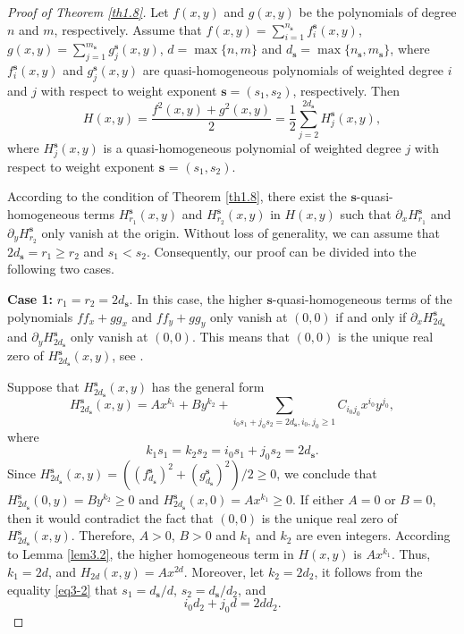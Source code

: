 \documentclass[10pt,a4paper]{amsart}
\numberwithin{equation}{section}
\begin{document}
\begin{proof}[Proof of Theorem \ref{th1.8}]
Let $f(x,y)$ and $g(x,y)$  be the polynomials of degree $n$ and $m$, respectively. 
Assume that $f(x,y)=\sum_{i=1}^{n_{\mathbf{s}}}f^{\mathbf{s}}_{i}(x,y)$, 
$g(x,y)=\sum_{j=1}^{m_{\mathbf{s}}}g^{\mathbf{s}}_{j}(x,y)$, $d=\max\{n,m\}$ and 
$d_{\mathbf{s}}=\max\{n_{\mathbf{s}},m_{\mathbf{s}}\}$, where 
$f^{\mathbf{s}}_{i}(x,y)$ and $g^{\mathbf{s}}_{j}(x,y)$ are quasi-homogeneous 
polynomials of weighted degree $i$ and $j$ with respect to weight exponent 
$\mathbf{s}=(s_1,s_2)$, respectively. Then
\[
H(x,y)=\frac{f^2(x,y)+g^2(x,y)}{2}
=\frac{1}{2}\sum_{j=2}^{2d_{\mathbf{s}}}H^{\mathbf{s}}_{j}(x,y),
\]
where $H^{\mathbf{s}}_j(x,y)$ is a quasi-homogeneous polynomial of weighted degree 
$j$ with respect to weight exponent $\mathbf{s}$ = $(s_1,s_2)$.

According to the condition of Theorem \ref{th1.8}, there exist the 
$\mathbf{s}$-quasi-homogeneous terms  $H^{\mathbf{s}}_{r_1}(x,y)$ and 
$H^{\mathbf{s}}_{r_2}(x,y)$ in  $H(x,y)$ such that
$\partial_{x}H^{\mathbf{s}}_{r_1}$ and $\partial_{y}H^{\mathbf{s}}_{r_2}$ only 
vanish at the origin. Without loss of generality, we can assume that 
$2d_{\mathbf{s}}=r_1\geq r_2$ and $s_1<s_2$. Consequently, our proof can be divided into 
the following two cases.
\smallskip

\noindent\textbf{Case 1:} $r_1=r_2=2d_{\mathbf{s}}$.
In this case, the higher $\mathbf{s}$-quasi-homogeneous terms of the polynomials 
$ ff_{x}+gg_{x} $ and $ ff_{y}+gg_{y} $ only vanish at $ (0,0) $ if and only if 
$\partial_{x}H^{\mathbf{s}}_{2d_{\mathbf{s}}}$ and 
$\partial_{y}H^{\mathbf{s}}_{2d_{\mathbf{s}}}$ only vanish at $ (0,0)$. 
This means that $(0,0)$ is the unique real zero of 
$H^{\mathbf{s}}_{2d_{\mathbf{s}}}(x,y)$, see \cite[Corollary 1]{bib 19}.

Suppose that $H^{\mathbf{s}}_{2d_{\mathbf{s}}}(x,y)$ has the general form
\begin{equation}\label{eq3-1}
H^{\mathbf{s}}_{2d_{\mathbf{s}}}(x,y)
=Ax^{k_1}+By^{k_2}+\sum_{i_0s_1+j_0s_2=2d_{\mathbf{s}}, 
i_0, j_0\geq1}C_{i_0j_0}x^{i_0}y^{j_0},
\end{equation}
where
\begin{equation}\label{eq3-2}
k_1s_1=k_2s_2=i_0s_1+j_0s_2=2d_{\mathbf{s}}.
\end{equation}
Since $H^{\mathbf{s}}_{2d_{\mathbf{s}}}(x,y)
=\left((f^{\mathbf{s}}_{d_{\mathbf{s}}})^2+(g^{\mathbf{s}}_{d_{\mathbf{s}}})^2
\right)/2\geq 0$, 
we conclude that $H^{\mathbf{s}}_{2d_{\mathbf{s}}}(0,y)=By^{k_2}\geq 0$ and 
$H^{\mathbf{s}}_{2d_{\mathbf{s}}}(x,0)=Ax^{k_1}\geq 0$. If either $A=0$ or $B=0$, 
then it would contradict the fact that $(0,0)$ is the unique real zero of 
$H^{\mathbf{s}}_{2d_{\mathbf{s}}}(x,y)$. Therefore, $A>0$, $B>0$ and $k_1$ and 
$k_2$ are even integers.
According to Lemma \ref{lem3.2}, the higher homogeneous term in $H(x,y)$ is $Ax^{k_1}$. 
Thus, $k_1=2d$, and $H_{2d}(x,y)=Ax^{2d}$. Moreover, let $k_2=2d_2$,
it follows from the equality \eqref{eq3-2} that $s_1=d_{\mathbf{s}}/d$, 
$s_2=d_{\mathbf{s}}/d_2$, and
\begin{equation}\label{eq3-3}
i_0d_2+j_0d=2dd_{2}.
\end{equation}


\end{proof}
\end{document}
